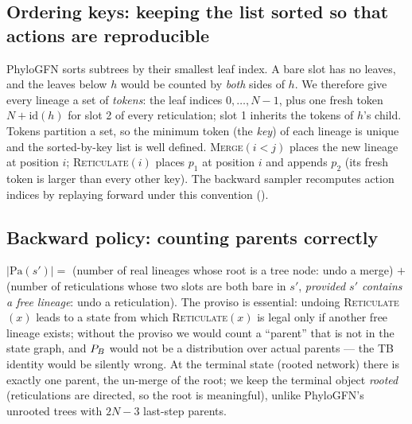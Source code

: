 \subsection{Ordering keys: keeping the list sorted so that actions are reproducible}
PhyloGFN sorts subtrees by their smallest leaf index. A bare slot has no leaves, and the leaves below $h$ would be counted by \emph{both} sides of $h$. We therefore give every lineage a set of \emph{tokens}: the leaf indices $0,\dots,N-1$, plus one fresh token $N+\mathrm{id}(h)$ for slot 2 of every reticulation; slot 1 inherits the tokens of $h$'s child. Tokens partition a set, so the minimum token (the \emph{key}) of each lineage is unique and the sorted-by-key list is well defined. \textsc{Merge}$(i<j)$ places the new lineage at position $i$; \textsc{Reticulate}$(i)$ places $p_1$ at position $i$ and appends $p_2$ (its fresh token is larger than every other key). The backward sampler recomputes action indices by replaying forward under this convention ().

\subsection{Backward policy: counting parents correctly}
$|\mathrm{Pa}(s')|=$ (number of real lineages whose root is a tree node: undo a merge) $+$ (number of reticulations whose two slots are both bare in $s'$, \emph{provided $s'$ contains a free lineage}: undo a reticulation). The proviso is essential: undoing \textsc{Reticulate}$(x)$ leads to a state from which \textsc{Reticulate}$(x)$ is legal only if another free lineage exists; without the proviso we would count a ``parent'' that is not in the state graph, and $P_B$ would not be a distribution over actual parents --- the TB identity would be silently wrong. At the terminal state (rooted network) there is exactly one parent, the un-merge of the root; we keep the terminal object \emph{rooted} (reticulations are directed, so the root is meaningful), unlike PhyloGFN's unrooted trees with $2N-3$ last-step parents.

